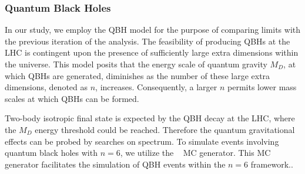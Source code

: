 \subsubsection{Quantum Black Holes}
In our study, we employ the QBH model for the purpose of comparing limits with the previous iteration of the analysis. The feasibility of producing QBHs at the LHC is contingent upon the presence of sufficiently large extra dimensions within the universe. This model posits that the energy scale of quantum gravity $M_{D}$, at which QBHs are generated, diminishes as the number of these large extra dimensions, denoted as $n$, increases. Consequently, a larger $n$ permits lower mass scales at which QBHs can be formed.

Two-body isotropic final state is expected by the QBH decay at the LHC, where the $M_D$ energy threshold could be reached. Therefore the quantum gravitational effects can be probed by searches on \mjj spectrum. To simulate events involving quantum black holes with $n=6$, we utilize the \BlackMax~\cite{Dai:2007ki} MC generator. This MC generator facilitates the simulation of QBH events within the $n=6$ framework..



%
%
%
%

